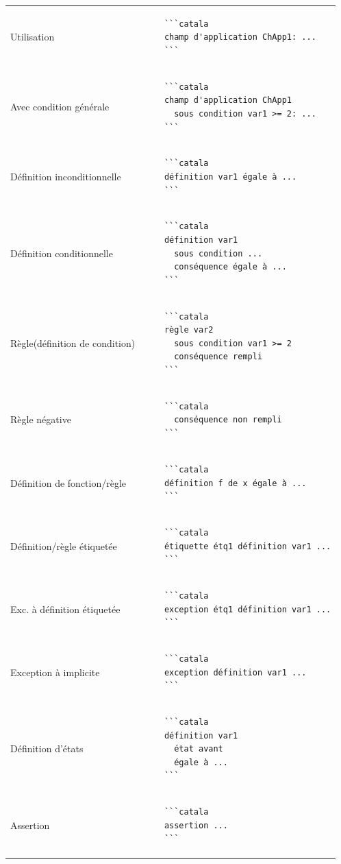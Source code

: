 \documentclass{article}
\makeatletter
\newenvironment{catala}{%
  \VerbatimEnvironment
  \let\FV@ListVSpace\relax
  \begin{verbatim}}%
 {\end{verbatim}}
\makeatother
\begin{document}
\begin{multicols}{3}
\begin{tabular}{@{}p{\cola}p{\colb}@{}}
  Utilisation & \begin{catala}
    ```catala
    champ d'application ChApp1: ...
    ```
  \end{catala}
  \\
  Avec condition générale & \begin{catala}
    ```catala
    champ d'application ChApp1
      sous condition var1 >= 2: ...
    ```
  \end{catala}
  \\
  Définition inconditionnelle & \begin{catala}
    ```catala
    définition var1 égale à ...
    ```
  \end{catala}
  \\
  Définition conditionnelle& \begin{catala}
    ```catala
    définition var1
      sous condition ...
      conséquence égale à ...
    ```
  \end{catala}
  \\
  Règle\newline(définition de condition) & \begin{catala}
    ```catala
    règle var2
      sous condition var1 >= 2
      conséquence rempli
    ```
  \end{catala}
  \\
  Règle négative & \begin{catala}
    ```catala
      conséquence non rempli
    ```
  \end{catala}
  \\
  Définition de fonction/règle & \begin{catala}
    ```catala
    définition f de x égale à ...
    ```
  \end{catala}
  \\
  Définition/règle étiquetée & \begin{catala}
    ```catala
    étiquette étq1 définition var1 ...
    ```
  \end{catala}
  \\
  Exc. à définition étiquetée & \begin{catala}
    ```catala
    exception étq1 définition var1 ...
    ```
  \end{catala}
  \\
  Exception à implicite & \begin{catala}
    ```catala
    exception définition var1 ...
    ```
  \end{catala}
  \\
  Définition d'états & \begin{catala}
    ```catala
    définition var1
      état avant
      égale à ...
    ```
  \end{catala}
  \\
  Assertion & \begin{catala}
    ```catala
    assertion ...
    ```
  \end{catala}
  \\
\end{tabular}


\end{multicols}
\end{document}
